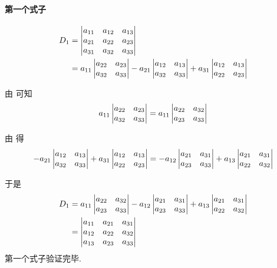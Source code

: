 \paragraph{第一个式子}

\begin{equation}
\begin{aligned}
    D_1 &= \begin{vmatrix}a_{11} & a_{12} & a_{13} \\ a_{21} & a_{22} & a_{23} \\ a_{31} & a_{32} & a_{33}\end{vmatrix} \\
    &= a_{11}\begin{vmatrix}a_{22} & a_{23} \\ a_{32} & a_{33}\end{vmatrix}
      -a_{21}\begin{vmatrix}a_{12} & a_{13} \\ a_{32} & a_{33}\end{vmatrix}
      +a_{31}\begin{vmatrix}a_{12} & a_{13} \\ a_{22} & a_{23}\end{vmatrix}
\end{aligned} 
\end{equation}

由 可知
\begin{equation}
    a_{11}\begin{vmatrix}a_{22} & a_{23} \\ a_{32} & a_{33}\end{vmatrix}
    =
    a_{11}\begin{vmatrix}a_{22} & a_{32} \\ a_{23} & a_{33}\end{vmatrix}
\end{equation}

由 得
\begin{equation}
    -a_{21}\begin{vmatrix}a_{12} & a_{13} \\ a_{32} & a_{33}\end{vmatrix}
    +a_{31}\begin{vmatrix}a_{12} & a_{13} \\ a_{22} & a_{23}\end{vmatrix}
    =
    -a_{12}\begin{vmatrix}a_{21} & a_{31} \\ a_{23} & a_{33}\end{vmatrix}
    +a_{13}\begin{vmatrix}a_{21} & a_{31} \\ a_{22} & a_{32}\end{vmatrix}
\end{equation}

于是
\begin{equation}
\begin{aligned}
    D_1 &= a_{11}\begin{vmatrix}a_{22} & a_{32} \\ a_{23} & a_{33}\end{vmatrix}
    -a_{12}\begin{vmatrix}a_{21} & a_{31} \\ a_{23} & a_{33}\end{vmatrix}
    +a_{13}\begin{vmatrix}a_{21} & a_{31} \\ a_{22} & a_{32}\end{vmatrix} \\
    &= \begin{vmatrix}
        a_{11} & a_{21} & a_{31} \\
        a_{12} & a_{22} & a_{32} \\
        a_{13} & a_{23} & a_{33}
    \end{vmatrix}
\end{aligned}
\end{equation}
第一个式子验证完毕.

